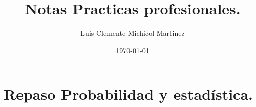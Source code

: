 \documentclass[11pt, twoside, openright]{book}
\title{Notas Practicas profesionales.}
\author{Luis Clemente Michicol Martinez}
\date{\today}
\begin{document}
\frontmatter
\maketitle
%

\tableofcontents
\listoffigures
\listoftables


\mainmatter
\part{Repaso Probabilidad y estadística.}


%

%

\backmatter
\printbibliography[title=Referencias Bibliográficas]

\end{document}
